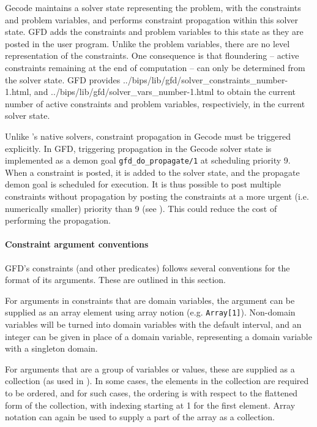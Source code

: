 Gecode maintains a solver state representing the problem, with the constraints
and problem variables, and performs constraint propagation within this solver
state. GFD adds the constraints and problem variables to this state
as they are posted in the user program. Unlike
the problem variables, there are no \eclipse level representation of the
constraints. One consequence is that floundering -- active constraints 
remaining at the end of computation -- can only be determined from the solver
state. GFD provides 
{../bips/lib/gfd/solver_constraints_number-1.html},  
and 
{../bips/lib/gfd/solver_vars_number-1.html} to obtain the current number of
active constraints and problem variables, respectiviely, in the current solver
state.

Unlike \eclipse's native solvers, constraint propagation in Gecode must be 
triggered explicitly. In GFD, triggering propagation in the Gecode solver state
is implemented as a demon goal {\tt gfd_do_propagate/1} at scheduling 
priority 9.
When a constraint is posted, it is added to the solver state,
and the propagate demon goal is
scheduled for execution. It is thus possible to post multiple
 constraints without propagation by posting the constraints at a more
urgent (i.e. numerically smaller) priority than 9 (see
).
This could reduce the cost of performing the propagation.

\paragraph{Constraint argument conventions}

GFD's constraints (and other predicates) follows several conventions 
for the format of its arguments. These are outlined in this section.

For arguments in constraints that are domain variables, the argument 
can be supplied as an
array element using array notion (e.g. \verb|Array[1]|).
Non-domain variables will be turned into domain variables with the default 
interval, and an integer can be given in place of a domain variable, 
representing a domain variable with a singleton domain. 

For arguments that are a group of variables or values, these are supplied
as a collection  
(as used in ). In some cases, the elements in the collection are required to be 
ordered, and for such cases, the ordering is 
with respect to the flattened form of the collection, with indexing starting
at 1 for the first element. Array notation can again be used to supply a 
part of the array as a collection.

